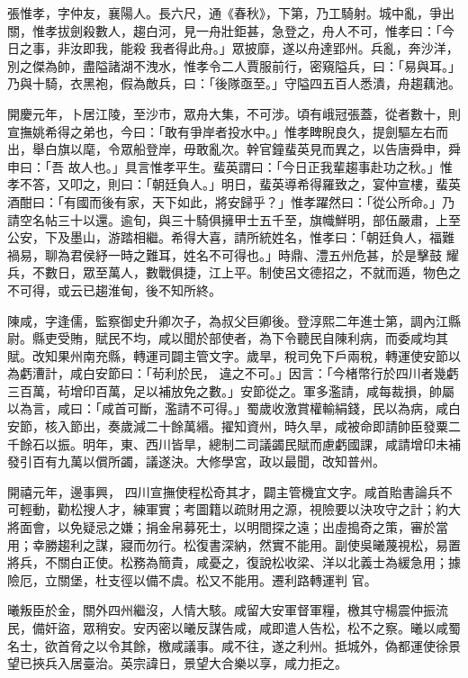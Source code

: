 \begin{pinyinscope}
 張惟孝，字仲友，襄陽人。長六尺，通《春秋》，下第，乃工騎射。城中亂，爭出關，惟孝拔劍殺數人，趨白河，見一舟壯鉅甚，急登之，舟人不可，惟孝曰：「今日之事，非汝即我，能殺
 我者得此舟。」眾披靡，遂以舟達郢州。兵亂，奔沙洋，別之傑為帥，盡隘諸湖不洩水，惟孝令二人賈服前行，密窺隘兵，曰：「易與耳。」乃與十騎，衣黑袍，假為敵兵，曰：「後隊亟至。」守隘四五百人悉潰，舟趨藕池。



 開慶元年，卜居江陵，至沙市，眾舟大集，不可涉。頃有峨冠張蓋，從者數十，則宣撫姚希得之弟也，今曰：「敢有爭岸者投水中。」惟孝睥睨良久，提劍驅左右而出，舉白旗以麾，令眾船登岸，毋敢亂次。幹官鐘蜚英見而異之，以告唐舜申，舜申曰：「吾
 故人也。」具言惟孝平生。蜚英謂曰：「今日正我輩趨事赴功之秋。」惟孝不答，又叩之，則曰：「朝廷負人。」明日，蜚英導希得羅致之，宴仲宣樓，蜚英酒酣曰：「有國而後有家，天下如此，將安歸乎？」惟孝躍然曰：「從公所命。」乃請空名帖三十以還。逾旬，與三十騎俱擁甲士五千至，旗幟鮮明，部伍嚴肅，上至公安，下及墨山，游踏相繼。希得大喜，請所統姓名，惟孝曰：「朝廷負人，福難禍易，聊為君侯紓一時之難耳，姓名不可得也。」時鼎、澧五州危甚，於是擊鼓
 耀兵，不數日，眾至萬人，數戰俱捷，江上平。制使呂文德招之，不就而遁，物色之不可得，或云已趨淮甸，後不知所終。



 陳咸，字逢儒，監察御史升卿次子，為叔父巨卿後。登淳熙二年進士第，調內江縣尉。縣吏受賄，賦民不均，咸以聞於部使者，為下令聽民自陳利病，而委咸均其賦。改知果州南充縣，轉運司闢主管文字。歲旱，稅司免下戶兩稅，轉運使安節以為虧漕計，咸白安節曰：「茍利於民，
 違之不可。」因言：「今楮幣行於四川者幾虧三百萬，茍增印百萬，足以補放免之數。」安節從之。軍多濫請，咸每裁損，帥屬以為言，咸曰：「咸首可斷，濫請不可得。」蜀歲收激賞權輸絹錢，民以為病，咸白安節，核入節出，奏歲減二十餘萬緡。擢知資州，時久旱，咸被命即請帥臣發粟二千餘石以振。明年，東、西川皆旱，總制二司議蠲民賦而慮虧國課，咸請增印未補發引百有九萬以償所蠲，議遂決。大修學宮，政以最聞，改知普州。



 開禧元年，邊事興，
 四川宣撫使程松奇其才，闢主管機宜文字。咸首貽書論兵不可輕動，勸松搜人才，練軍實；考圖籍以疏財用之源，視險要以決攻守之計；約大將面會，以免疑忌之嫌；捐金帛募死士，以明間探之遠；出虛搗奇之策，審於當用；幸勝趨利之謀，寢而勿行。松復書深納，然實不能用。副使吳曦蔑視松，易置將兵，不關白正使。松務為簡貴，咸憂之，復說松收梁、洋以北義士為緩急用；據險厄，立關堡，杜支徑以備不虞。松又不能用。遷利路轉運判
 官。



 曦叛臣於金，關外四州繼沒，人情大駭。咸留大安軍督軍糧，檄其守楊震仲振流民，備奸盜，眾稍安。安丙密以曦反謀告咸，咸即遣人告松，松不之察。曦以咸蜀名士，欲首脅之以令其餘，檄咸議事。咸不往，遂之利州。抵城外，偽都運使徐景望已挾兵入居臺治。英宗諱日，景望大合樂以享，咸力拒之。




\end{pinyinscope}
